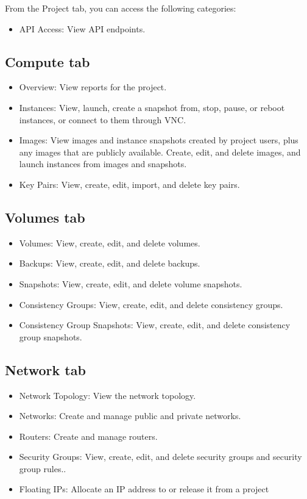 From the Project tab, you can access the following categories:
\begin{itemize}
\item
  API Access: View API endpoints.
\end{itemize}

\subsection*{\texorpdfstring{Compute
tab}{Compute tab}}\label{compute-tab}

\begin{itemize}
\item
  Overview: View reports for the project.
\item
  Instances: View, launch, create a snapshot from, stop, pause, or
  reboot instances, or connect to them through VNC.
\item
  Images: View images and instance snapshots created by project users,
  plus any images that are publicly available. Create, edit, and delete
  images, and launch instances from images and snapshots.
\item
  Key Pairs: View, create, edit, import, and delete key pairs.
\end{itemize}

\subsection*{\texorpdfstring{Volumes
tab}{Volumes tab}}\label{volumes-tab}

\begin{itemize}
\item
  Volumes: View, create, edit, and delete volumes.
\item
  Backups: View, create, edit, and delete backups.
\item
  Snapshots: View, create, edit, and delete volume snapshots.
\item
  Consistency Groups: View, create, edit, and delete consistency groups.
\item
  Consistency Group Snapshots: View, create, edit, and delete
  consistency group snapshots.
\end{itemize}

\subsection*{\texorpdfstring{Network
tab}{Network tab}}\label{network-tab}

\begin{itemize}
\item
  Network Topology: View the network topology.
\item
  Networks: Create and manage public and private networks.
\item
  Routers: Create and manage routers.
\item
  Security Groups: View, create, edit, and delete security groups and
  security group rules..
\item
  Floating IPs: Allocate an IP address to or release it from a project
\end{itemize}

